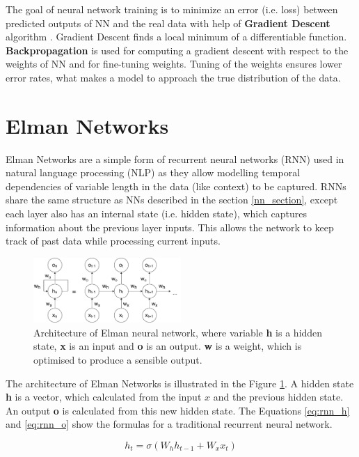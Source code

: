 The goal of neural network training is to minimize an error (i.e. loss) between predicted outputs of NN and the real data with help of \textbf{Gradient Descent} algorithm \cite{lemarechal2012cauchy}. Gradient Descent finds a local minimum of a differentiable function. \textbf{Backpropagation} \cite{rumelhart1986learning} is used for computing a gradient descent with respect to the weights of NN and for fine-tuning weights. Tuning of the weights ensures lower error rates, what makes a model to approach the true distribution of the data. 

\section{Elman Networks} \label{rnn_section}
Elman Networks are a simple form of recurrent neural networks (RNN) used in natural language processing (NLP) as they allow modelling temporal dependencies of variable length in the data (like context) to be captured. RNNs share the same structure as NNs described in the section \ref{nn_section}, except each layer also has an internal state (i.e. hidden state), which captures information about the previous layer inputs. This allows the network to keep track of past data while processing current inputs.

\begin{figure}[hbt]
  \centering
  \includegraphics[width=0.5\textwidth]{figures/rnn.pdf}
  \caption{Architecture of Elman neural network, where variable \textbf{h} is a hidden state, \textbf{x} is an input and \textbf{o} is an output. \textbf{w} is a weight, which is optimised to produce a sensible output.}
  \label{rnn}
\end{figure}

The architecture of Elman Networks is illustrated in the Figure \ref{rnn}. A hidden state \textbf{h} is a vector, which calculated from the input $x$ and the previous hidden state. An output \textbf{o} is calculated from this new hidden state. 
The Equations \ref{eq:rnn_h} and \ref{eq:rnn_o} show the formulas for a traditional recurrent neural network.

\begin{equation} \label{eq:rnn_h}
h_t = \sigma(W_hh_{t-1} + W_xx_t)
\end{equation}


